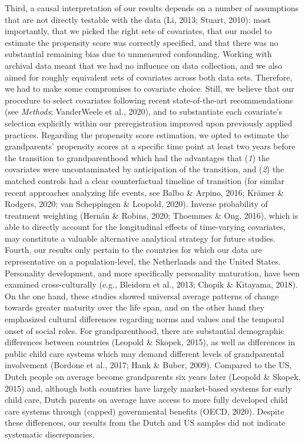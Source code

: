 \documentclass[
  english,
  man, noextraspace]{apa7}
\begin{document}
Third, a causal interpretation of our results depends on a number of assumptions that are not directly testable with the data (Li, 2013; Stuart, 2010): most importantly, that we picked the right sets of covariates, that our model to estimate the propensity score was correctly specified, and that there was no substantial remaining bias due to unmeasured confounding. Working with archival data meant that we had no influence on data collection, and we also aimed for roughly equivalent sets of covariates across both data sets. Therefore, we had to make some compromises to covariate choice. Still, we believe that our procedure to select covariates following recent state-of-the-art recommendations (see \emph{Methods}; VanderWeele et al., 2020), and to substantiate each covariate's selection explicitly within our preregistration improved upon previously applied practices. Regarding the propensity score estimation, we opted to estimate the grandparents' propensity scores at a specific time point at least two years before the transition to grandparenthood which had the advantages that (\emph{1}) the covariates were uncontaminated by anticipation of the transition, and (\emph{2}) the matched controls had a clear counterfactual timeline of transition (for similar recent approaches analyzing life events, see Balbo \& Arpino, 2016; Krämer \& Rodgers, 2020; van Scheppingen \& Leopold, 2020). Inverse probability of treatment weighting (Hernán \& Robins, 2020; Thoemmes \& Ong, 2016), which is able to directly account for the longitudinal effects of time-varying covariates, may constitute a valuable alternative analytical strategy for future studies.\\
Fourth, our results only pertain to the countries for which our data are representative on a population-level, the Netherlands and the United States. Personality development, and more specifically personality maturation, have been examined cross-culturally (e.g., Bleidorn et al., 2013; Chopik \& Kitayama, 2018). On the one hand, these studies showed universal average patterns of change towards greater maturity over the life span, and on the other hand they emphasized cultural differences regarding norms and values and the temporal onset of social roles. For grandparenthood, there are substantial demographic differences between countries (Leopold \& Skopek, 2015), as well as differences in public child care systems which may demand different levels of grandparental involvement (Bordone et al., 2017; Hank \& Buber, 2009). Compared to the US, Dutch people on average become grandparents six years later (Leopold \& Skopek, 2015) and, although both countries have largely market-based systems for early child care, Dutch parents on average have access to more fully developed child care systems through (capped) governmental benefits (OECD, 2020). Despite these differences, our results from the Dutch and US samples did not indicate systematic discrepancies.\\
\end{document}
